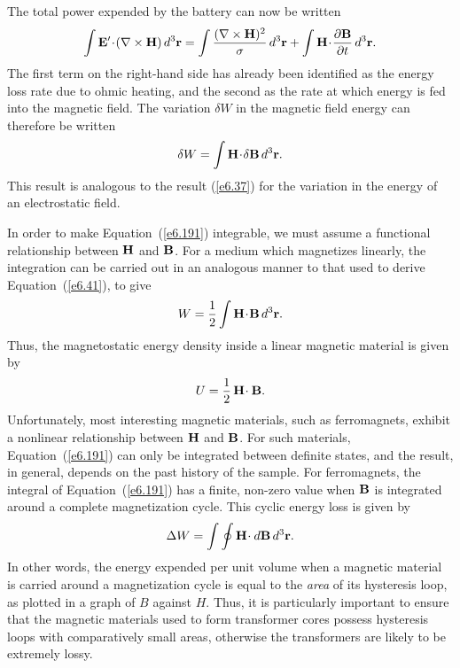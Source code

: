 The total power expended by the battery can now be written
\begin{equation}
\int {\bf E}'\!\cdot\!(\nabla\times{\bf H})\,d^3{\bf r}
= \int\frac{(\nabla\times{\bf H})^2}{\sigma}
\,d^3{\bf r} + \int {\bf H}\!\cdot\!\frac{\partial{\bf B}}{\partial t}
\,d^3{\bf r}.
\end{equation}
The first term on the right-hand side has already been identified as the
energy 
loss rate due to ohmic  heating, and the second as  the
rate at which energy is fed into the magnetic field. The variation
$\delta W$ in the magnetic field energy can therefore be written
\begin{equation}\label{e6.191}
\delta W = \int {\bf H}\!\cdot\!\delta {\bf B}\,d^3{\bf r}.
\end{equation}
This result is analogous to the result (\ref{e6.37}) for the variation in the
energy of an electrostatic field. 

In order to make Equation~(\ref{e6.191}) integrable, we must assume a functional
relationship between ${\bf H}$ and ${\bf B}$. For a medium which
magnetizes linearly, the integration can be carried out in an analogous manner to that used to derive Equation~(\ref{e6.41}), to give
\begin{equation}
W  = \frac{1}{2} \int {\bf H}\!\cdot\!{\bf B} \,d^3{\bf r}.
\end{equation}
Thus, the magnetostatic energy density inside a linear magnetic
material is given by
\begin{equation}\label{e6en}
U=\frac{1}{2}\, {\bf H}\!\cdot{\bf B}.
\end{equation}
Unfortunately, most interesting magnetic materials, such as ferromagnets,
exhibit a nonlinear relationship between ${\bf H}$ and ${\bf B}$. 
For such materials, Equation~(\ref{e6.191}) can only be integrated between
definite states, and the result, in general, depends on the past
history of the sample. For ferromagnets, the integral of Equation~(\ref{e6.191}) has
a finite, non-zero value when ${\bf B}$ is integrated around a
complete magnetization  cycle. This cyclic energy loss
is given by
\begin{equation}
\Delta W = \int \oint {\bf H}\!\cdot d{\bf B} \,d^3{\bf r}.
\end{equation}
In other words, the energy expended per unit volume when a magnetic
material is carried around a magnetization cycle is equal to the {\em area} of
its hysteresis loop, as plotted in a graph of $B$ against $H$. Thus,
it is particularly important to ensure that the magnetic
materials used to form
transformer cores possess hysteresis loops with comparatively small
areas, otherwise the transformers are  likely to be extremely lossy. 

